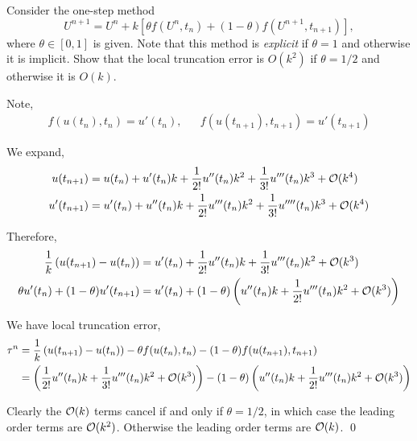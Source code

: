 \documentclass[10pt]{article}
\begin{document}
\begin{problem}[Problem 3]
Consider the one-step method
\[
U^{n+1} = U^n + k [ \theta f( U^n , t_n ) + (1 - \theta ) f ( U^{n+1} , t_{n+1} ) ] ,
\]
where \( \theta \in [0,1] \) is given.  Note that this method is {\em explicit} if \( \theta = 1 \)
and otherwise it is implicit.  Show that the local truncation error is \( O( k^2 ) \) if \( \theta = 1/2 \)
and otherwise it is \( O(k) \).
\end{problem}

\begin{solution}[Solution]

Note,
\begin{align*}
    f(u(t_n),t_n) = u'(t_n), && f(u(t_{n+1}),t_{n+1}) = u'(t_{n+1})
\end{align*}


We expand,
\begin{align*}
    u(t_{n+1}) &= u(t_n) + u'(t_n)k + \dfrac{1}{2!}u''(t_n)k^2 + \dfrac{1}{3!}u'''(t_n)k^3 + \mathcal{O}(k^4) \\
    u'(t_{n+1}) &= u'(t_n) + u''(t_n)k + \dfrac{1}{2!}u'''(t_n)k^2 + \dfrac{1}{3!}u''''(t_n)k^3 + \mathcal{O}(k^4) \\
\end{align*}

Therefore,
\begin{align*}
    \dfrac{1}{k} \left( u(t_{n+1}) - u(t_n) \right) &= u'(t_n) + \dfrac{1}{2!}u''(t_n)k + \dfrac{1}{3!} u'''(t_n)k^2 + \mathcal{O}(k^3) \\
    \theta u'(t_n) + (1-\theta) u'(t_{n+1}) &= u'(t_n) + (1-\theta)\left( u''(t_n)k + \dfrac{1}{2!}u'''(t_n)k^2 + \mathcal{O}(k^3) \right)
\end{align*}

We have local truncation error,
\begin{align*}
    \tau^n &= \dfrac{1}{k} \left( u(t_{n+1})-u(t_n) \right) - \theta f(u(t_n),t_n) - (1-\theta) f(u(t_{n+1}),t_{n+1})
    \\&= \left( \dfrac{1}{2!}u''(t_n)k + \dfrac{1}{3!}u'''(t_n)k^2 + \mathcal{O}(k^3) \right) - (1-\theta) \left( u''(t_n)k + \dfrac{1}{2!}u'''(t_n)k^2 + \mathcal{O}(k^3) \right)
\end{align*}

Clearly the \( \mathcal{O}(k) \) terms cancel if and only if \( \theta = 1/2 \), in which case the leading order terms are \( \mathcal{O}(k^2) \). Otherwise the leading order terms are \( \mathcal{O}(k) \). \qed

\end{solution}
\end{document}
